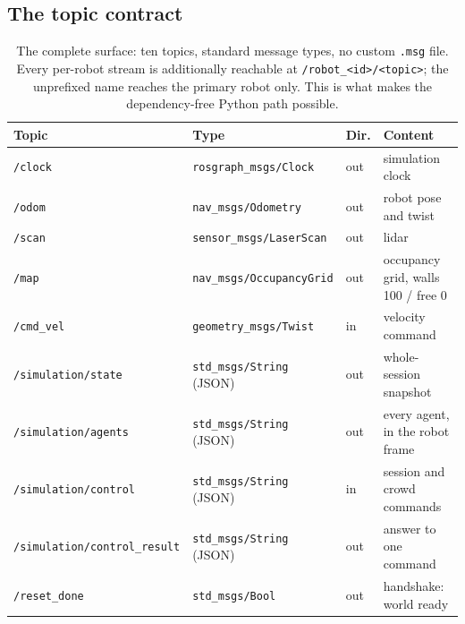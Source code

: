 \documentclass[pdflatex,sn-mathphys-num]{template/sn-jnl}%
\begin{document}
\subsection{The topic contract}
\label{sec:platform:contract}

\begin{table}[t]
  \centering
  \caption{The complete surface: ten topics, standard message types, no custom
  \texttt{.msg} file. Every per-robot stream is additionally reachable at
  \texttt{/robot\_\textless id\textgreater/\textless topic\textgreater}; the
  unprefixed name reaches the primary robot only. This is what makes the
  dependency-free Python path possible.}
  \label{tab:topics}
  \begin{tabular}{llll}
    \toprule
    Topic & Type & Dir. & Content \\
    \midrule
    \texttt{/clock}                        & \texttt{rosgraph\_msgs/Clock}    & out & simulation clock \\
    \texttt{/odom}                         & \texttt{nav\_msgs/Odometry}      & out & robot pose and twist \\
    \texttt{/scan}                         & \texttt{sensor\_msgs/LaserScan}  & out & lidar \\
    \texttt{/map}                          & \texttt{nav\_msgs/OccupancyGrid} & out & occupancy grid, walls 100 / free 0 \\
    \texttt{/cmd\_vel}                     & \texttt{geometry\_msgs/Twist}    & in  & velocity command \\
    \texttt{/simulation/state}             & \texttt{std\_msgs/String} (JSON) & out & whole-session snapshot \\
    \texttt{/simulation/agents}            & \texttt{std\_msgs/String} (JSON) & out & every agent, in the robot frame \\
    \texttt{/simulation/control}           & \texttt{std\_msgs/String} (JSON) & in  & session and crowd commands \\
    \texttt{/simulation/control\_result}   & \texttt{std\_msgs/String} (JSON) & out & answer to one command \\
    \texttt{/reset\_done}                  & \texttt{std\_msgs/Bool}          & out & handshake: world ready \\
    \bottomrule
  \end{tabular}
\end{table}
\end{document}
